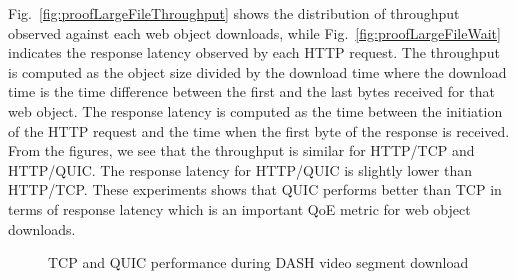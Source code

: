 Fig.~\ref{fig:proofLargeFileThroughput} shows the distribution of throughput observed against each web object downloads, while Fig.~\ref{fig:proofLargeFileWait} indicates the response latency observed by each HTTP request. The throughput is computed as the object size divided by the download time where the download time is the time difference between the first and the last bytes received for that web object. The response latency is computed as the time between the initiation of the HTTP request and the time when the first byte of the response is received. From the figures, we see that the throughput is similar for HTTP/TCP and HTTP/QUIC. The response latency for HTTP/QUIC is slightly lower than HTTP/TCP. These experiments shows that QUIC performs better than TCP in terms of response latency which is an important QoE metric for web object downloads. 


\begin{figure}[!ht]
	\captionsetup[subfigure]{}
	\begin{center}
		\hfill
	\end{center}
	\caption{\label{fig:dashcomp}TCP and QUIC performance during DASH video segment download}
\end{figure}


